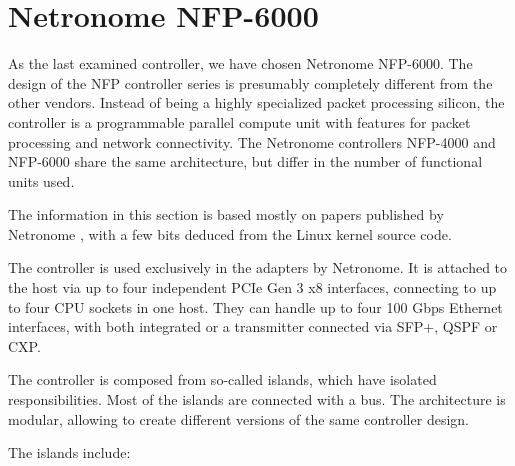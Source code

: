 \section{Netronome NFP-6000}


As the last examined controller, we have chosen Netronome NFP-6000. The design
of the NFP controller series is presumably completely different from the other
vendors. Instead of being a highly specialized packet processing silicon, the
controller is a programmable parallel compute unit with features for packet
processing and network connectivity. The Netronome controllers NFP-4000 and
NFP-6000 share the same architecture, but differ in the number of functional
units used.

The information in this section is based mostly on papers published by Netronome
\cite{nfp-4k-too,nfp-prm,nfp-micro-c}, with a few bits deduced from the Linux
kernel source code.

The controller is used exclusively in the adapters by Netronome. It is attached to
the host via up to four independent PCIe Gen 3 x8 interfaces, connecting to up
to four CPU sockets in one host. They can handle up to four 100 Gbps Ethernet
interfaces, with both integrated  or a transmitter connected via SFP+,
QSPF or CXP.

The controller is composed from so-called islands, which have isolated
responsibilities. Most of the islands are connected with a bus.
The architecture is modular, allowing to create
different versions of the same controller design.

The islands include:

